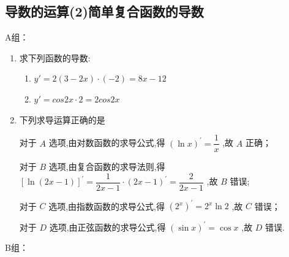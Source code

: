 \subsection*{导数的运算(2)简单复合函数的导数}
A组：
\begin{enumerate}
    \item 求下列函数的导数:
    \begin{jieda}
        \begin{enumerate}
            \item $y' = 2(3-2x)\cdot (-2) = 8x-12$
            \item $y' = cos2x \cdot 2 = 2cos2x$
        \end{enumerate}
    \end{jieda}
    
    \item 下列求导运算正确的是
    \begin{jieda}
        对于 ${A}$ 选项,由对数函数的求导公式,得 ${\left( \ln x\right) }^{\prime } = \dfrac{1}{x}$ ,故 ${A}$ 正确；
        
        对于 ${B}$ 选项,由复合函数的求导法则,得 ${\left\lbrack  \ln \left( 2x - 1\right) \right\rbrack  }^{\prime } = \dfrac{1}{{2x} - 1} \cdot  {\left( 2x - 1\right) }^{\prime } = \dfrac{2}{{2x} - 1}$ ,故 ${B}$ 错误;
        
        对于 ${C}$ 选项,由指数函数的求导公式,得 ${\left( {2}^{x}\right) }^{\prime } = {2}^{x}\ln 2$ ,故 ${C}$ 错误；
        
        对于 ${D}$ 选项,由正弦函数的求导公式,得 ${\left( \sin x\right) }^{\prime } = \cos x$ ,故 ${D}$ 错误.
    \end{jieda}
\end{enumerate}
B组：
